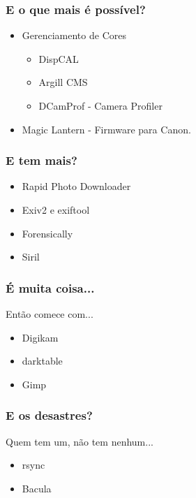 
\begin{frame}
    \frametitle{E o que mais é possível?}
    \begin{itemize}
        \item Gerenciamento de Cores
        \begin{itemize}
            \item DispCAL
            \item Argill CMS
            \item DCamProf - Camera Profiler
        \end{itemize}
        \item Magic Lantern - Firmware para Canon.
    \end{itemize}
\end{frame}


\begin{frame}
    \frametitle{E tem mais?}
    \begin{itemize}
        \item Rapid Photo Downloader
        \item Exiv2 e exiftool
        \item Forensically
        \item Siril
    \end{itemize}
\end{frame}


\begin{frame}
    \frametitle{É muita coisa...}
    Então comece com...
    \begin{itemize}
        \item Digikam
        \item darktable
        \item Gimp
    \end{itemize}
\end{frame}


\begin{frame}
    \frametitle{E os desastres?}
    Quem tem um, não tem nenhum...
    \begin{itemize}
        \item rsync
        \item Bacula
    \end{itemize}
\end{frame}

